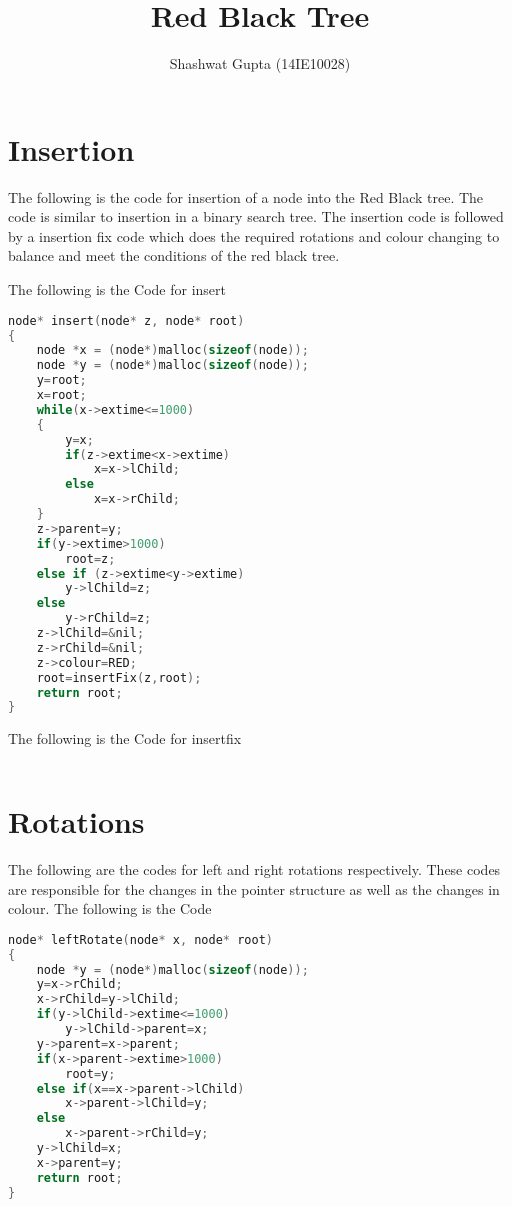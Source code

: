 \documentclass{article}
\title{Red Black Tree}
\author{Shashwat Gupta (14IE10028)}
\begin{document}
\maketitle

\section{Insertion}

The following is the code for insertion of a node into the Red Black tree. The code is similar to insertion in a binary search tree. The insertion code is followed by a insertion fix code which does the required rotations and colour changing to balance and meet the conditions of the red black tree.

The following is the Code for insert
\begin{lstlisting}[language=c, caption=insert]
node* insert(node* z, node* root)
{
    node *x = (node*)malloc(sizeof(node));
    node *y = (node*)malloc(sizeof(node));
    y=root;
    x=root;
    while(x->extime<=1000)
    {
        y=x;
        if(z->extime<x->extime)
            x=x->lChild;
        else
            x=x->rChild;
    }
    z->parent=y;
    if(y->extime>1000)
        root=z;
    else if (z->extime<y->extime)
        y->lChild=z;
    else
        y->rChild=z;
    z->lChild=&nil;
    z->rChild=&nil;
    z->colour=RED;
    root=insertFix(z,root);
    return root;
}
\end{lstlisting}

The following is the Code for insertfix
\begin{lstlisting}[language=c, caption=insert fix]

\end{lstlisting}

\section{Rotations}

The following are the codes for left and right rotations respectively.
These codes are responsible for the changes in the pointer structure as well as the changes in colour.
The following is the Code
\begin{lstlisting}[language=c, caption=left]
node* leftRotate(node* x, node* root)
{
    node *y = (node*)malloc(sizeof(node));
    y=x->rChild;
    x->rChild=y->lChild;
    if(y->lChild->extime<=1000)
        y->lChild->parent=x;
    y->parent=x->parent;
    if(x->parent->extime>1000)
        root=y;
    else if(x==x->parent->lChild)
        x->parent->lChild=y;
    else
        x->parent->rChild=y;
    y->lChild=x;
    x->parent=y;
    return root;
}
\end{lstlisting}
\end{document}
